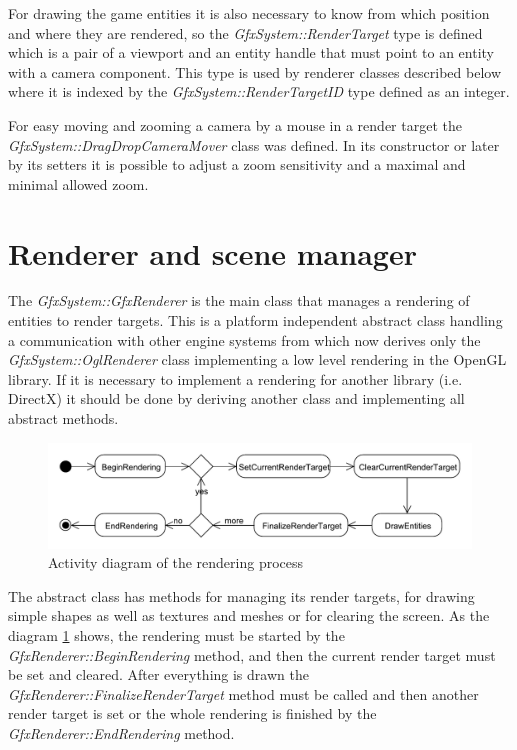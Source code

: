 \documentclass[a4paper, 12pt]{report}
\begin{document}
For drawing the game entities it is also necessary to know from which position and where they are rendered, so the \emph{GfxSystem::RenderTarget} type is defined which is a pair of a viewport and an entity handle that must point to an entity with a camera component. This type is used by renderer classes described below where it is indexed by the \emph{GfxSystem::RenderTargetID} type defined as an integer.

For easy moving and zooming a camera by a mouse in a render target the \emph{GfxSystem::DragDropCameraMover} class was defined. In its constructor or later by its setters it is possible to adjust a zoom sensitivity and a maximal and minimal allowed zoom.

\section{Renderer and scene manager}

The \emph{GfxSystem::GfxRenderer} is the main class that manages a rendering of entities to render targets. This is a platform independent abstract class handling a communication with other engine systems from which now derives only the \emph{GfxSystem::OglRenderer} class implementing a low level rendering in the OpenGL library\cite{opengl}. If it is necessary to implement a rendering for another library (i.e. DirectX) it should be done by deriving another class and implementing all abstract methods.

\begin{figure}[htbp]
	\centering
		\includegraphics[width=1\textwidth]{RenderingActivityDiagram.pdf}
	\caption{Activity diagram of the rendering process}
	\label{fig:rendering-diagram}
\end{figure}

The abstract class has methods for managing its render targets, for drawing simple shapes as well as textures and meshes or for clearing the screen. As the diagram \ref{fig:rendering-diagram} shows, the rendering must be started by the \emph{GfxRenderer::BeginRendering} method, and then the current render target must be set and cleared. After everything is drawn the \emph{GfxRenderer\-::Finalize\-Render\-Target} method must be called and then another render target is set or the whole rendering is finished by the \emph{GfxRenderer::EndRendering} method.
\end{document}
